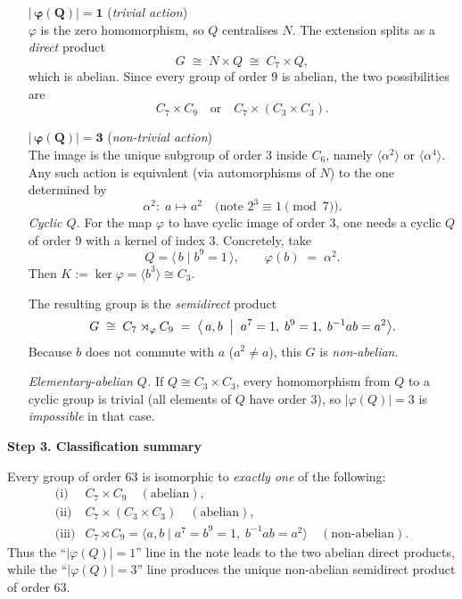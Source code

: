 \documentclass[12pt]{article}
\theoremstyle{definition} %
\theoremstyle{plain} %
\begin{document}
\smallskip
\begin{enumerate}
   \item[\(\boldsymbol{|\,\varphi(Q)| = 1}\)] (\emph{trivial action})\\
         \(\varphi\) is the zero homomorphism, so \(Q\) centralises \(N\).
         The extension splits as a \emph{direct} product
         \[
            G \;\cong\; N\times Q
            \;\cong\; C_{7}\times Q,
         \]
         which is abelian.  Since every group of order \(9\) is abelian,
         the two possibilities are
         \[
            C_{7}\times C_{9}
            \quad\text{or}\quad
            C_{7}\times (C_{3}\times C_{3}).
         \]
   \item[\(\boldsymbol{|\,\varphi(Q)| = 3}\)] (\emph{non-trivial action})\\
         The image is the unique subgroup of order \(3\) inside \(C_{6}\),
         namely \(\langle\alpha^{2}\rangle\) or \(\langle\alpha^{4}\rangle\).
         Any such action is equivalent (via automorphisms of \(N\))
         to the one determined by
         \[
            \alpha^{2}:\; a\longmapsto a^{2}\quad
            \bigl(\text{note }2^{3} \equiv 1\pmod{7}\bigr).
         \]
         \emph{Cyclic \(Q\).}  
         For the map \(\varphi\) to have cyclic image of order 3, one needs
         a cyclic \(Q\) of order 9 with a kernel of index 3.
         Concretely, take
         \[
            Q = \langle\,b \mid b^{9}=1\,\rangle,
            \qquad
            \varphi(b)\;=\;\alpha^{2}.
         \]
         Then \(K := \ker\varphi = \langle b^{3}\rangle \cong C_{3}\).

         \smallskip
         The resulting group is the \emph{semidirect} product
         \[
            G \;\cong\;
            C_{7}\rtimes_{\varphi} C_{9}
            \;=\;
            \bigl\langle\,a,b
              \;\bigm|\;
                 a^{7}=1,\;
                 b^{9}=1,\;
                 b^{-1}ab = a^{2}\bigr\rangle.
         \]
         Because \(b\) does not commute with \(a\) (\(a^{2}\neq a\)),
         this \(G\) is \emph{non-abelian}.

         \emph{Elementary-abelian \(Q\).}  
         If \(Q\cong C_{3}\times C_{3}\), every homomorphism from \(Q\)
         to a cyclic group is trivial (all elements of \(Q\) have order 3),
         so \(|\varphi(Q)|=3\) is \emph{impossible} in that case.
\end{enumerate}

\bigskip
\textbf{Step 3.  Classification summary}

Every group of order \(63\) is isomorphic to \emph{exactly one} of the
following:
\[
\begin{array}{ll}
\text{(i)} & C_{7}\times C_{9}\quad (\text{abelian}),\\[4pt]
\text{(ii)} & C_{7}\times(C_{3}\times C_{3})\quad (\text{abelian}),\\[4pt]
\text{(iii)} & C_{7}\rtimes C_{9}
             = \langle a,b \mid a^{7}=b^{9}=1,\;
               b^{-1}ab=a^{2}\rangle\quad (\text{non-abelian}).
\end{array}
\]
Thus the “\(|\varphi(Q)| = 1\)” line in the note leads to the two
abelian direct products, while the “\(|\varphi(Q)| = 3\)” line
produces the unique non-abelian semidirect product of order \(63\).
\end{document}
